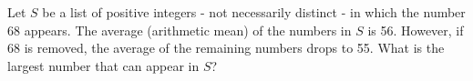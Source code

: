 Let $S$ be a list of positive integers - not necessarily distinct - in which the number 68 appears.  The average (arithmetic mean) of the numbers in $S$ is 56.  However, if 68 is removed, the average of the remaining numbers drops to 55.  What is the largest number that can appear in $S$?